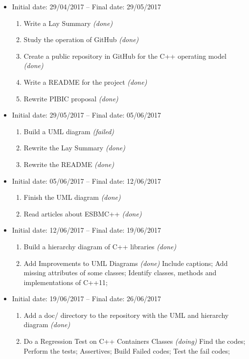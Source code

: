 \documentclass[11pt]{article}
\begin{document}
\begin{itemize}
	\item Initial date: 29/04/2017 -- Final date: 29/05/2017
	\begin{enumerate}
		\item Write a Lay Summary {\it (done)}
		\item Study the operation of GitHub {\it (done)}
		\item Create a public repository in GitHub for the C++ operating model {\it (done)}
		\item Write a README for the project {\it (done)}
		\item Rewrite PIBIC proposal {\it (done)}
	\end{enumerate}
	
	\item Initial date: 29/05/2017 -- Final date: 05/06/2017
	\begin{enumerate}
		\item Build a UML diagram {\it (failed)}
		\item Rewrite the Lay Summary {\it (done)}
		\item Rewrite the README {\it (done)}		
	\end{enumerate}
	
	\item Initial date: 05/06/2017 -- Final date: 12/06/2017
	\begin{enumerate}
		\item Finish the UML diagram {\it (done)}
		\item Read articles about ESBMC++ {\it (done)}				
	\end{enumerate}
	
	\item Initial date: 12/06/2017 -- Final date: 19/06/2017
	\begin{enumerate}
		\item Build a hierarchy diagram of C++ libraries {\it (done)}
		\item Add Improvements to UML Diagrams {\it (done)}
		    \subitem Include captions;
		    \subitem Add missing attributes of some classes;
		    \subitem Identify classes, methods and implementations of C++11;
	\end{enumerate}
	
	\item Initial date: 19/06/2017 -- Final date: 26/06/2017
	\begin{enumerate}
		\item Add a doc/ directory to the repository with the UML and hierarchy diagram {\it (done)}
		\item Do a Regression Test on C++ Containers Classes {\it (doing)}
			\subitem Find the codes;
			\subitem Perform the tests;
			\subitem Assertives;
			\subitem Build Failed codes;
			\subitem Test the fail codes;
	\end{enumerate}
	
	
\end{itemize}
\end{document}
